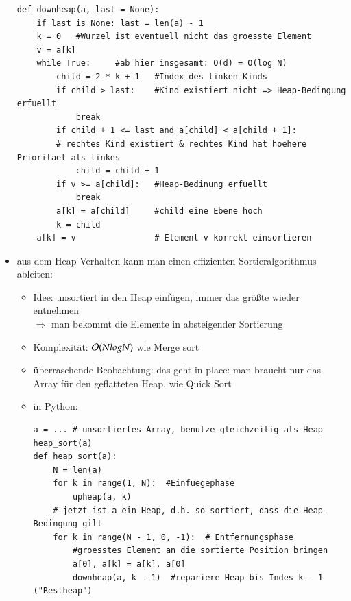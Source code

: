 \begin{itemize}
\begin{verbatim}
def downheap(a, last = None):
    if last is None: last = len(a) - 1
    k = 0   #Wurzel ist eventuell nicht das groesste Element
    v = a[k]
    while True:     #ab hier insgesamt: O(d) = O(log N)
        child = 2 * k + 1   #Index des linken Kinds
        if child > last:    #Kind existiert nicht => Heap-Bedingung erfuellt
            break
        if child + 1 <= last and a[child] < a[child + 1]:
        # rechtes Kind existiert & rechtes Kind hat hoehere Prioritaet als linkes
            child = child + 1
        if v >= a[child]:   #Heap-Bedinung erfuellt
            break
        a[k] = a[child]     #child eine Ebene hoch
        k = child
    a[k] = v                # Element v korrekt einsortieren
        \end{verbatim}
        \item aus dem Heap-Verhalten kann man einen effizienten Sortieralgorithmus ableiten:
        \begin{itemize}
            \item Idee: unsortiert in den Heap einfügen, immer das größte wieder entnehmen\\
            $\Rightarrow$ man bekommt die Elemente in absteigender Sortierung
            \item Komplexität: $\mathcal{O}{}(N log N)$ wie Merge sort
            \item überraschende Beobachtung: das geht in-place: man braucht nur das Array für den geflatteten Heap, wie Quick Sort
            \item in Python:
            \begin{verbatim}
a = ... # unsortiertes Array, benutze gleichzeitig als Heap
heap_sort(a)
def heap_sort(a):
    N = len(a)
    for k in range(1, N):  #Einfuegephase
        upheap(a, k)
    # jetzt ist a ein Heap, d.h. so sortiert, dass die Heap-Bedingung gilt
    for k in range(N - 1, 0, -1):  # Entfernungsphase
        #groesstes Element an die sortierte Position bringen
        a[0], a[k] = a[k], a[0]
        downheap(a, k - 1)  #repariere Heap bis Indes k - 1 ("Restheap")
            \end{verbatim}
        \end{itemize}
\end{itemize}

